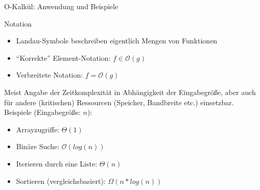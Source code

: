 \begin{frame}{O-Kalkül: Anwendung und Beispiele}
	\begin{block}{Notation}
		\begin{itemize}
			\item Landau-Symbole beschreiben eigentlich Mengen von Funktionen
			\item \enquote{Korrekte} Element-Notation: $f \in \mathcal{O}(g)$
			\item Verbreitete Notation: $f = \mathcal{O}(g)$
		\end{itemize}
	\end{block}
	
	\pause
	
		Meist Angabe der Zeitkomplexität in Abhängigkeit der Eingabegröße, aber auch für andere (kritischen) Ressourcen (Speicher, Bandbreite etc.) einsetzbar. Beispiele (Eingabegröße: $n$):
		\begin{itemize}
			\item Arrayzugriffe: $\Theta(1)$
			\item Binäre Suche: $\mathcal{O}(log(n))$
			\item Iterieren durch eine Liste: $\Theta(n)$
			\item Sortieren (vergleichsbasiert): $\Omega(n*log(n))$
		\end{itemize}
\end{frame}

